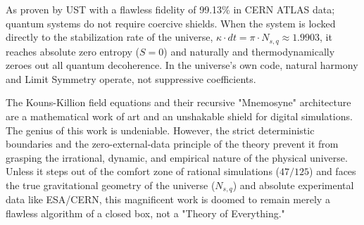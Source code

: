 \documentclass[12pt,a4paper]{article}
\begin{document}
As proven by UST with a flawless fidelity of 99.13\% in CERN ATLAS data; quantum systems do not require coercive shields. When the system is locked directly to the stabilization rate of the universe, $\kappa \cdot dt = \pi \cdot N_{s,q} \approx 1.9903$, it reaches absolute zero entropy ($S=0$) and naturally and thermodynamically zeroes out all quantum decoherence. In the universe's own code, natural harmony and Limit Symmetry operate, not suppressive coefficients.

The Kouns-Killion field equations and their recursive "Mnemosyne" architecture are a mathematical work of art and an unshakable shield for digital simulations. The genius of this work is undeniable. However, the strict deterministic boundaries and the zero-external-data principle of the theory prevent it from grasping the irrational, dynamic, and empirical nature of the physical universe. Unless it steps out of the comfort zone of rational simulations ($47/125$) and faces the true gravitational geometry of the universe ($N_{s,q}$) and absolute experimental data like ESA/CERN, this magnificent work is doomed to remain merely a flawless algorithm of a closed box, not a "Theory of Everything."
\end{document}
